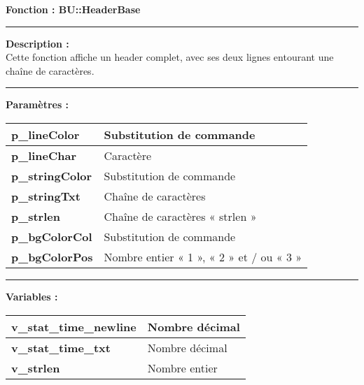 \documentclass[a4paper,10pt]{article}
\begin{document}
\textbf{Fonction : \color{func}BU::HeaderBase}\\

\par\noindent\rule{\textwidth}{0.4pt}

\begin{justify}
    \textbf{Description :}\\[1\baselineskip]
    Cette fonction affiche un header complet, avec ses deux lignes entourant une chaîne de caractères.
\end{justify}

\par\noindent\rule{\textwidth}{0.4pt}

\begin{justify}
    \textbf{Paramètres :}

    \begin{tabular}{|l|l|}
        \hline
        \textbf{\color{vars}p\_lineColor} & Substitution de commande\\ 
        \hline
        \textbf{\color{vars}p\_lineChar} & Caractère\\ 
        \hline
        \textbf{\color{vars}p\_stringColor} & Substitution de commande\\ 
        \hline
        \textbf{\color{vars}p\_stringTxt} & Chaîne de caractères\\ 
        \hline
        \textbf{\color{vars}p\_strlen} & Chaîne de caractères « strlen »\\
        \hline
        \textbf{\color{vars}p\_bgColorCol} & Substitution de commande\\
        \hline
        \textbf{\color{vars}p\_bgColorPos} & Nombre entier « 1 », « 2 » et / ou « 3 »\\
        \hline
    \end{tabular}
\end{justify}

\setlength{\parskip}{2em}
\par\noindent\rule{\textwidth}{0.4pt}\setlength{\parskip}{1em}

\begin{justify}
    \textbf{Variables :}\\[1\baselineskip]
    \begin{tabular}{|l|l|}
        \hline
        \textbf{\color{vars}v\_stat\_time\_newline} & Nombre décimal\\
        \hline
        \textbf{\color{vars}v\_stat\_time\_txt} & Nombre décimal\\
        \hline
        \textbf{\color{vars}v\_strlen} & Nombre entier\\
        \hline
    \end{tabular}
\end{justify}
\end{document}
